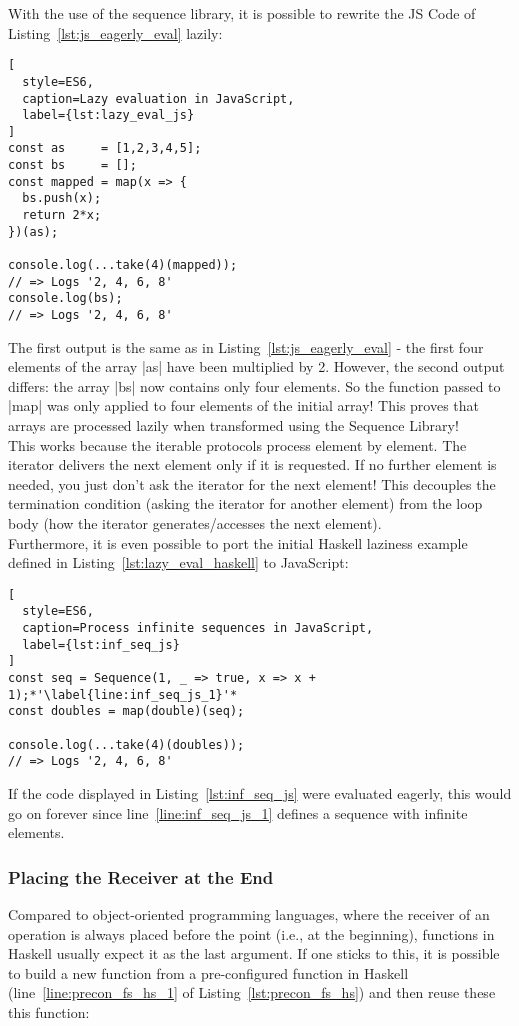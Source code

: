 With the use of the sequence library, it is possible to rewrite the JS Code of
Listing~\ref{lst:js_eagerly_eval} lazily:


\begin{lstlisting}[
  style=ES6,
  caption=Lazy evaluation in JavaScript,
  label={lst:lazy_eval_js}
]
const as     = [1,2,3,4,5];
const bs     = [];
const mapped = map(x => {
  bs.push(x);
  return 2*x;
})(as);

console.log(...take(4)(mapped));
// => Logs '2, 4, 6, 8'
console.log(bs);
// => Logs '2, 4, 6, 8'
\end{lstlisting}

The first output is the same as in Listing~\ref{lst:js_eagerly_eval} - the
first four elements of the array |as| have been multiplied by 2. However, the
second output differs: the array |bs| now contains only four elements. So the
function passed to |map| was only applied to four elements of the initial
array! This proves that arrays are processed lazily when transformed using the
Sequence Library!\\
This works because the iterable protocols process element by element. The
iterator delivers the next element only if it is requested. If no further
element is needed, you just don't ask the iterator for the next element! This
decouples the termination condition (asking the iterator for another element)
from the loop body (how the iterator generates/accesses the next element).\\

Furthermore, it is even possible to port the initial Haskell laziness
example defined in Listing~\ref{lst:lazy_eval_haskell} to JavaScript:
\begin{lstlisting}[
  style=ES6,
  caption=Process infinite sequences in JavaScript,
  label={lst:inf_seq_js}
]
const seq = Sequence(1, _ => true, x => x + 1);*'\label{line:inf_seq_js_1}'*
const doubles = map(double)(seq);

console.log(...take(4)(doubles));
// => Logs '2, 4, 6, 8'
\end{lstlisting}

If the code displayed in Listing~\ref{lst:inf_seq_js} were evaluated eagerly,
this would go on forever since line~\ref{line:inf_seq_js_1} defines a sequence
with infinite elements. \\ 

\subsubsection{Placing the Receiver at the End} %
\label{subsub:Placing the Receiver at the End}
Compared to object-oriented programming languages, where the receiver of an
operation is always placed before the point (i.e., at the beginning), functions
in Haskell usually expect it as the last argument. If one sticks to this, it is
possible to build a new function from a pre-configured function in Haskell
(line~\ref{line:precon_fs_hs_1} of Listing~\ref{lst:precon_fs_hs}) and then
reuse these this function:

